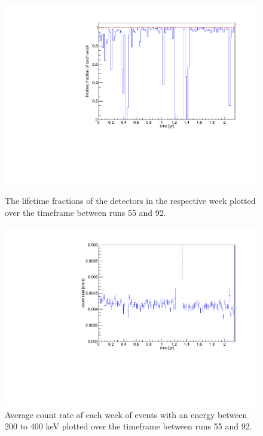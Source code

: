 \documentclass[encoding=utf8,british]{tumphthesis}
\begin{document}
\begin{figure}[t!]
	\centering
   	\begin{minipage}[t]{.475\textwidth}
		\centering
		\includegraphics[width=\textwidth]{./Bilder/onceInALivetime.pdf}
		\caption{The lifetime fractions of the detectors in the respective week plotted over the timeframe between runs 55 and 92.}
		\label{fig:lifetime}
	\end{minipage}\hfill%
   	\begin{minipage}[t]{.475\textwidth}
		\centering
		\includegraphics[width=\textwidth]{./Bilder/eventRate.pdf}
		\caption{Average count rate of each week of events with an energy between 200 to 400 keV plotted over the timeframe between runs 55 and 92. }
		\label{fig:ChangeInEventRate}
	\end{minipage}
	
\vspace{5mm}
\end{figure}
\end{document}
